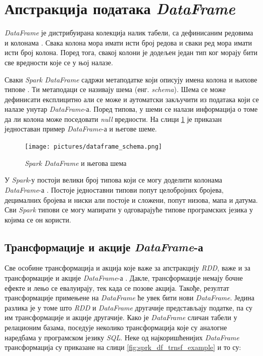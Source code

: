 \documentclass[12pt,oneside]{memoir}
\begin{document}
\section{Апстракција података \textit{DataFrame}}
\label{sec:spark_df}

\textit{DataFrame} је дистрибуирана колекција налик табели, са дефинисаним редовима и колонама \cite{spark_guide}. Свака колона мора имати исти број редова и сваки ред мора имати исти број колона. Поред тога, свакој колони је додељен један тип ког морају бити све вредности које се у њој налазе.

Сваки \textit{Spark DataFrame} садржи метаподатке који описују имена колона и њихове типове  \cite{spark_guide}. Ти метаподаци се називају шема (енг. \textit{schema}). Шема се може дефинисати експлицитно али се може и аутоматски закључити из података који се налазе унутар \textit{DataFrame}-а. Поред типова, у шеми се налази информација о томе да ли колона може поседовати \textit{null} вредности. На слици \ref{fig:sprk_df_schema_example} је приказан једноставан пример \textit{DataFrame}-а и његове шеме.

\begin{figure}[!ht]
  \centering
  \texttt{[image: pictures/dataframe\_schema.png]}
  \caption{\textit{Spark DataFrame} и његова шема}
  \label{fig:sprk_df_schema_example}
\end{figure}

У \textit{Spark}-у постоји велики број типова који се могу доделити колонама \textit{DataFrame}-а \cite{spark_guide}. Постоје једноставни типови попут целобројних бројева, децималних бројева и ниски али постоје и сложени, попут низова, мапа и датума. Сви \textit{Spark} типови се могу мапирати у одговарајуће типове програмских језика у којима се он користи.

\subsection{Трансформације и акције \textit{DataFrame}-а}
\label{subsec:spark_sql_ac_tr}

Све особине трансформација и акција које важе за апстракцију \textit{RDD}, важе и за трансформације и акције \textit{DataFrame}-а \cite{spark_guide}. Дакле, трансформације немају бочне ефекте и лењо се евалуирају, тек када се позове акција. Такође, резултат трансформације примењене на \textit{DataFrame} ће увек бити нови \textit{DataFrame}. Једина разлика је у томе што \textit{RDD} и \textit{DataFrame} другачије представљају податке, па су им трансформације и акције другачије. Како је \textit{DataFrame} сличан табели у релационим базама, поседује неколико трансформација које су аналогне наредбама у програмском језику \textit{SQL}. Неке од најкоришћенијих \textit{DataFrame} трансформација су приказане на слици \ref{fig:sprk_df_trnsf_example} и то су:
\end{document}
